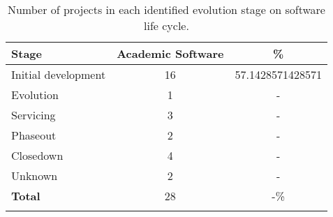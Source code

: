 \begin{table}[htb]
  \caption{Number of projects in each identified evolution stage on software life cycle.}
  \centering
  \begin{tabular}{l c c}
    \hline
    {\bf Stage} & {\bf Academic Software} & {\bf \%} \\
    \hline
    Initial development & 16 & 57.1428571428571 \\
    Evolution & 1 & - \\
    Servicing & 3 & - \\
    Phaseout & 2 & - \\
    Closedown & 4 & - \\
    Unknown & 2 & - \\
    \hline
      {\bf Total}         & 28 & -\% \\
    \hline
    \label{life-cycle-table}
  \end{tabular}
\end{table}
